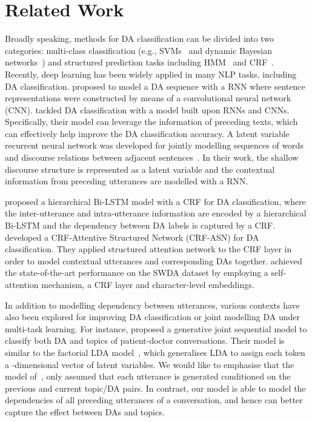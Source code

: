 \documentclass[11pt,a4paper]{article}
\begin{document}
\section{Related Work} \label{sec:relate}

Broadly speaking, methods for DA classification can be divided into two  categories: multi-class classification (e.g., 
SVMs~\cite{liu2006using} and dynamic Bayesian networks~\cite{dielmann2008recognition}) and structured prediction tasks including HMM~\cite{stolcke2000dialogue} and CRF~\cite{kim2010classifying}. 
Recently, deep learning has been widely applied in many NLP tasks, including DA classification. \citet{kalchbrenner2013recurrent}  proposed to model a DA sequence with a 
RNN where sentence representations were constructed by means of a convolutional neural network (CNN). \citet{lee2016sequential}  tackled DA classification with a model built upon RNNs and CNNs. Specifically, their model can leverage the information of preceding texts, which can effectively help improve the DA classification accuracy. 
A latent variable recurrent neural network was developed for jointly modelling sequences of words and discourse relations between adjacent sentences~\cite{ji2016latent}. In their work, the shallow discourse structure is represented as a latent variable and the contextual information from preceding utterances are modelled with a RNN. 

\citet{kumar2017dialogue}  proposed a hierarchical
Bi-LSTM model with a CRF for DA classification, where the inter-utterance and intra-utterance information are encoded by a hierarchical Bi-LSTM and the dependency between DA labels is captured by a CRF. \citet{chen2018dialogue} developed a CRF-Attentive Structured Network (CRF-ASN) for DA classification. They applied structured attention network to the CRF layer in order to model contextual utterances and corresponding DAs together. \citet{raheja2019dialogue} achieved the state-of-the-art performance on the SWDA dataset by employing a self-attention mechanism, a CRF layer and character-level embeddings.



In addition to modelling dependency between utterances, various contexts have also been explored for improving DA classification or joint modelling DA under multi-task learning. 
For instance, \citet{wallace2013generative}  proposed a generative joint sequential model to classify both DA and topics of patient-doctor conversations. Their model is similar to the factorial LDA model~\cite{paul2012factorial}, which generalises LDA to assign each token a -dimensional vector of latent variables. We would like to emphasise that the model of~\citet{wallace2013generative}, 
only assumed that each utterance is generated conditioned on the previous and current topic/DA pairs. In contrast, our model is able to model the dependencies of all preceding  utterances of a conversation, and hence can better capture the effect between DAs and topics.
\end{document}
